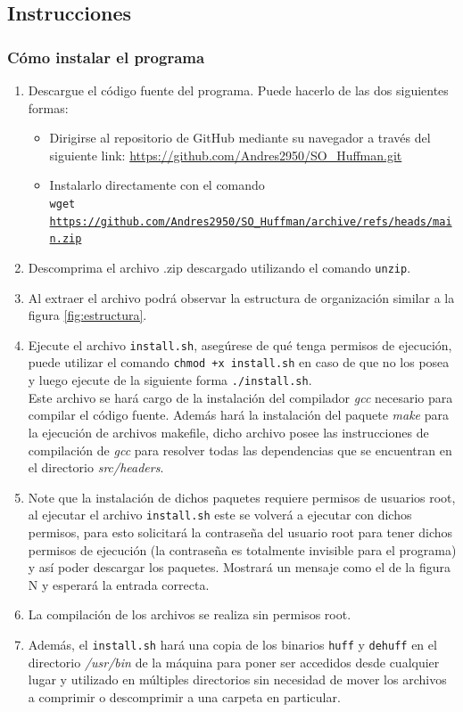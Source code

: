\documentclass{report}
\begin{document}
\subsection{Instrucciones}
\subsubsection{Cómo instalar el programa}
\begin{enumerate}
  \item Descargue el código fuente del programa. Puede hacerlo de las dos siguientes formas:
    \begin{itemize}
      \item Dirigirse al repositorio de GitHub mediante su navegador a través del siguiente link: \url{https://github.com/Andres2950/SO\_Huffman.git}
      \item Instalarlo directamente con el comando \\
    \texttt{wget \url{https://github.com/Andres2950/SO\_Huffman/archive/refs/heads/main.zip}}
    \end{itemize}
  \item Descomprima el archivo .zip descargado utilizando el comando \texttt{unzip}.
  \item Al extraer el archivo podrá observar la estructura de organización similar a la figura \ref{fig:estructura}.
\item Ejecute el archivo \texttt{install.sh}, asegúrese de qué tenga permisos de ejecución, puede utilizar el comando \texttt{chmod +x install.sh} en caso de que no los posea y luego ejecute de la siguiente forma \texttt{./install.sh}. \\
  Este archivo se hará cargo de la instalación del compilador \textit{gcc} necesario para compilar el código fuente. Además hará la instalación del paquete \textit{make} para la ejecución de archivos makefile, dicho archivo posee las instrucciones de compilación de \textit{gcc} para resolver todas las dependencias que se encuentran en el directorio \textit{src/headers}.  
\item Note que la instalación de dichos paquetes requiere permisos de usuarios root, al ejecutar el archivo \texttt{install.sh} este se volverá a ejecutar con dichos permisos, para esto solicitará la contraseña del usuario root para tener dichos permisos de ejecución (la contraseña es totalmente invisible para el programa) y así poder descargar los paquetes. Mostrará un mensaje como el de la figura N y esperará la entrada correcta.
\item La compilación de los archivos se realiza sin permisos root.
\item Además, el \texttt{install.sh} hará una copia de los binarios \texttt{huff} y \texttt{dehuff} en el directorio \textit{/usr/bin} de la máquina para poner ser accedidos desde cualquier lugar y utilizado en múltiples directorios sin necesidad de mover los archivos a comprimir o descomprimir a una carpeta en particular.

\end{enumerate}
\end{document}
